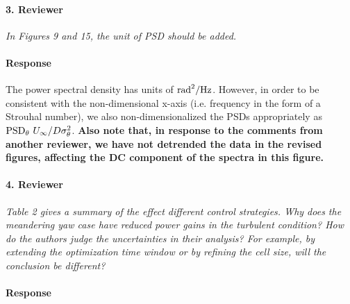 \documentclass[]{article}
\newcommand{\red}[1]{\textbf{\color{red} #1}}
\begin{document}
\paragraph{3. Reviewer} \textit{In Figures 9 and 15, the unit of PSD should be added.}

\paragraph{Response} The power spectral density has units of ${\rm rad}^2 / {\rm Hz}$. However, in order to be consistent with the non-dimensional x-axis (i.e. frequency in the form of a Strouhal number), we also non-dimensionalized the PSDs appropriately as ${\rm PSD}_\theta \ U_\infty / D \sigma_{\theta}^2$. \red{Also note that, in response to the comments from another reviewer, we have not detrended the data in the revised figures, affecting the DC component of the spectra in this figure.}

\hrulefill

\paragraph{4. Reviewer} \textit{Table 2 gives a summary of the effect different control strategies. Why does the meandering yaw case have reduced power gains in the turbulent condition? How do the authors judge the uncertainties in their analysis? For example, by extending the optimization time window or by refining the cell size, will the conclusion be different?}

\paragraph{Response} 
\end{document}
